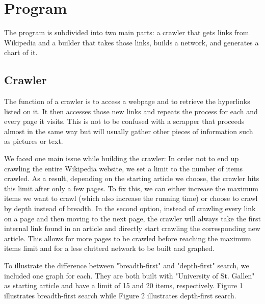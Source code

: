 \documentclass[10pt]{article}
\begin{document}
\section{Program}
The program is subdivided into two main parts: a crawler that gets links from Wikipedia and a builder that takes those links, builds a network, and generates a chart of it.

	\subsection{Crawler}
	The function of a crawler is to access a webpage and to retrieve the hyperlinks listed on it. It then accesses those new links and repeats the process for each and every page it 	
	visits. This is not to be confused with a scrapper that proceeds almost in the same way but will usually gather other pieces of information such as pictures or text.
	\par \noindent
	We faced one main issue while building the crawler: In order not to end up crawling the entire Wikipedia website, we set a limit to the number of items crawled. As a result, 	
	depending on the starting article we choose, the crawler hits this limit after only a few pages. To fix this, we can either increase the maximum items we want to crawl (which also 
	increase the running time) or choose to crawl by depth instead of breadth. In the second option, instead of crawling every link on a page and then moving to the next page, the 
	crawler will always take the first internal link found in an article and directly start crawling the corresponding new article. This allows for more pages to be crawled before reaching 
	the maximum items limit and for a less clutterd network to be built and graphed.\par \noindent

	To illustrate the difference between "breadth-first" and "depth-first" search, we included one graph for each. They are both built with "University of St. Gallen" as starting article and have a limit of 15 and 20 items, respectively. Figure 1 illustrates breadth-first search while Figure 2 illustrates depth-first search.\\
	
\end{document}
